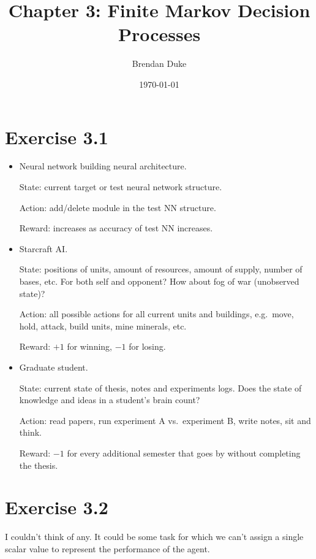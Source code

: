 \documentclass[a4paper, 12pt, titlepage]{article}
\date{\today}
\title{Chapter 3: Finite Markov Decision Processes}
\author{Brendan Duke}
\begin{document}
\maketitle


\section{Exercise 3.1}

\begin{itemize}
        \item Neural network building neural architecture.

                State: current target or test neural network structure.

                Action: add/delete module in the test NN structure.

                Reward: increases as accuracy of test NN increases.

        \item Starcraft AI\@.

                State: positions of units, amount of resources, amount of
                supply, number of bases, etc. For both self and opponent? How
                about fog of war (unobserved state)?

                Action: all possible actions for all current units and
                buildings, e.g.\ move, hold, attack, build units, mine
                minerals, etc.

                Reward: $+1$ for winning, $-1$ for losing.

        \item Graduate student.

                State: current state of thesis, notes and experiments logs.
                Does the state of knowledge and ideas in a student's brain
                count?

                Action: read papers, run experiment A vs.\ experiment B, write
                notes, sit and think.

                Reward: $-1$ for every additional semester that goes by without
                completing the thesis.
\end{itemize}


\section{Exercise 3.2}

I couldn't think of any. It could be some task for which we can't assign a
single scalar value to represent the performance of the agent.
\end{document}
